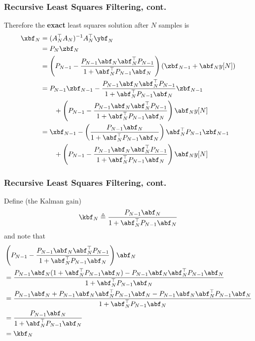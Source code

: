 \documentclass{beamer}
\begin{document}
\begin{frame}\frametitle{Recursive Least Squares Filtering, cont.}
	Therefore the {\bf exact} least squares solution after $N$ samples is 
	\begin{align*}
		\xbf_N	&= (A_N^\top  A_N)^{-1} A_N^\top \ybf_N \\
				&= P_N \zbf_N \\
				&= \left( P_{N-1} - \frac{P_{N-1}\abf_N\abf_N^\top P_{N-1}}{1+\abf_N^\top P_{N-1}\abf_N} \right) \left( \zbf_{N-1} + \abf_N y[N] \right) \\
				&= P_{N-1} \zbf_{N-1} - \frac{P_{N-1}\abf_N\abf_N^\top P_{N-1}}{1+\abf_N^\top P_{N-1}\abf_N} \zbf_{N-1} \\
				  &\qquad + \left( P_{N-1} - \frac{P_{N-1}\abf_N\abf_N^\top P_{N-1}}{1+\abf_N^\top P_{N-1}\abf_N} \right)\abf_N y[N] \\
				&= \xbf_{N-1} - \left(\frac{P_{N-1}\abf_N}{1+\abf_N^\top P_{N-1}\abf_N}\right) \abf_N^\top P_{N-1}\zbf_{N-1} \\
					&\qquad + \left( P_{N-1} - \frac{P_{N-1}\abf_N\abf_N^\top P_{N-1}}{1+\abf_N^\top P_{N-1}\abf_N} \right) \abf_N y[N] \\
	\end{align*}
\end{frame}

\begin{frame}\frametitle{Recursive Least Squares Filtering, cont.}
	Define (the Kalman gain)
		\[
			\kbf_N \triangleq \frac{P_{N-1}\abf_N}{1+\abf_N^\top P_{N-1}\abf_N}
		\]
	and note that
	\begin{align*}
		&\left(P_{N-1} - \frac{P_{N-1}\abf_N\abf_N^\top P_{N-1}}{1+\abf_N^\top P_{N-1}\abf_N} \right) \abf_N  \\
		&= \frac{P_{N-1}\abf_N(1+\abf_N^\top P_{N-1}\abf_N) - P_{N-1}\abf_N\abf_N^\top P_{N-1}\abf_N}{1+\abf_N^\top P_{N-1}\abf_N}  \\
		&= \frac{P_{N-1}\abf_N+ P_{N-1}\abf_N\abf_N^\top P_{N-1}\abf_N - P_{N-1}\abf_N\abf_N^\top P_{N-1}\abf_N}{1+\abf_N^\top P_{N-1}\abf_N}  \\
		&= \frac{P_{N-1}\abf_N}{1+\abf_N^\top P_{N-1}\abf_N}  \\
		&= \kbf_N
	\end{align*}
\end{frame}
\end{document}
